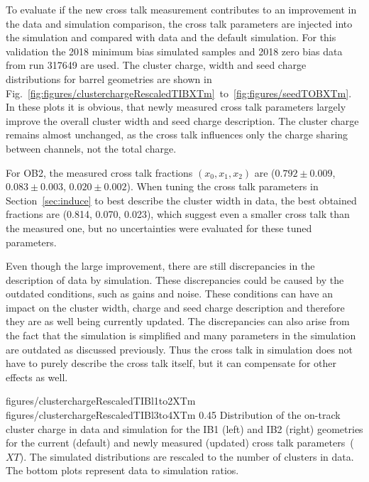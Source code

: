 To evaluate if the new cross talk measurement contributes to an improvement in the data and simulation comparison,  the cross talk parameters are injected into the simulation and compared with data and the default simulation. For this validation the 2018 minimum bias simulated samples and 2018 zero bias data from run 317649 are used. The cluster charge, width and seed charge distributions for barrel geometries are shown in Fig.~\ref{fig:figures/clusterchargeRescaledTIBXTm}~to~\ref{fig:figures/seedTOBXTm}. In these plots it is obvious, that newly measured cross talk parameters largely improve the overall cluster width and seed charge description. The cluster charge remains almost unchanged, as the cross talk influences only the charge sharing between channels, not the total charge.  

For OB2, the measured cross talk fractions $(x_{0}, x_{1}, x_{2})$ are ($0.792 \pm 0.009 $, $0.083 \pm 0.003 $, $0.020 \pm 0.002$). When tuning the cross talk parameters in Section~\ref{sec:induce} to best describe the cluster width in data, the best obtained fractions are (0.814, 0.070, 0.023), which suggest even a smaller cross talk than the measured one, but no uncertainties were evaluated for these tuned parameters. 

Even though the large improvement, there are still discrepancies in the description of data by simulation. These discrepancies could be caused by the outdated conditions, such as gains and noise. These conditions can have an impact on the cluster width, charge and seed charge description and therefore they are as well being currently updated. The discrepancies can also arise from the fact that the simulation is simplified and many parameters in the simulation are outdated as discussed previously. Thus the cross talk in simulation does not have to purely describe the cross talk itself, but it can compensate for other effects as well. 


                 {figures/clusterchargeRescaledTIBl1to2XTm} %
                 {figures/clusterchargeRescaledTIBl3to4XTm} %
                 {0.45}       %
                 { Distribution of the on-track cluster charge in data and simulation for the IB1 (left) and IB2 (right) geometries for the current (default) and newly measured (updated) cross talk parameters~($XT$).  The simulated distributions are rescaled to the number of clusters in data.  The bottom plots represent data to simulation ratios. }

